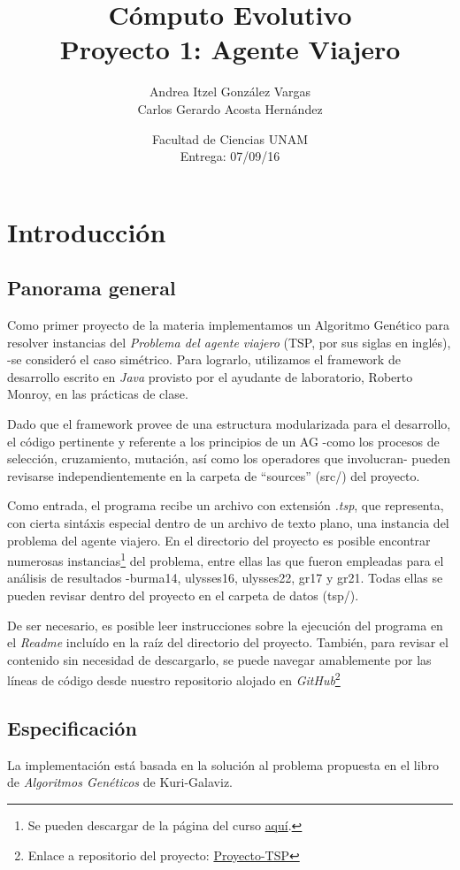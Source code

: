 \documentclass[12pt]{article}
\title{Cómputo Evolutivo \\ Proyecto 1: Agente Viajero}
\author{Andrea Itzel González Vargas \\
  Carlos Gerardo Acosta Hernández}
\date{Facultad de Ciencias UNAM \\ Entrega: 07/09/16}
\begin{document}
\maketitle
\section*{Introducción}
\subsection*{Panorama general}
Como primer proyecto de la materia implementamos un Algoritmo Genético
para resolver instancias del
\textit{Problema del agente viajero} (TSP, por sus siglas en inglés),
-se consideró el caso simétrico.
Para lograrlo, utilizamos el framework de desarrollo escrito en \textit{Java}
provisto por el ayudante de laboratorio, Roberto Monroy, en las prácticas de clase.\par
Dado que el framework provee de
una estructura modularizada para el desarrollo, el código pertinente y
referente a los principios de un AG -como los procesos de selección,
cruzamiento, mutación, así como los operadores que involucran- pueden
revisarse independientemente en la carpeta de ``sources'' (src/) del proyecto.\par
Como entrada, el programa recibe un archivo con extensión \textit{.tsp},
que representa, con cierta sintáxis especial dentro de un archivo de texto plano,
una instancia del problema del agente viajero.
En el directorio del proyecto
es posible encontrar numerosas instancias\footnote{Se pueden descargar de la página del curso \href{https://sites.google.com/site/unamfcienciascomputoevolutivo/assignments/assignment1/tsp.tar.gz}{aquí}.} del problema, entre ellas las que
fueron empleadas para el análisis de resultados -burma14, ulysses16, ulysses22, gr17 y gr21.
Todas ellas se pueden revisar dentro del proyecto en el carpeta de datos (tsp/).\par
De ser necesario, es posible leer instrucciones sobre la ejecución del programa
en el \textit{Readme} incluído en la raíz del directorio del proyecto.
También, para revisar el contenido sin necesidad de descargarlo,
se puede navegar amablemente por las líneas de código desde nuestro repositorio
alojado en \textit{GitHub}\footnote{Enlace a repositorio del proyecto: \href{https://github.com/Kihui/Proyecto-TSP}{Proyecto-TSP}}

\subsection*{Especificación}
La implementación está basada en la solución al problema propuesta en el
libro de \textit{Algoritmos Genéticos} de Kuri-Galaviz.
\end{document}
